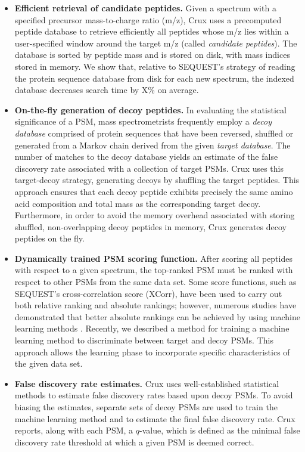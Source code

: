 \documentclass{bioinfo}
\begin{document}
\begin{itemize}

\item {\bf Efficient retrieval of candidate peptides.}  Given a
  spectrum with a specified precursor mass-to-charge ratio (m/z), Crux
  uses a precomputed peptide database to retrieve efficiently all
  peptides whose m/z lies within a user-specified window around the
  target m/z (called {\em candidate peptides}).  The database is
  sorted by peptide mass and is stored on disk, with mass indices
  stored in memory.  We show that, relative to SEQUEST's strategy of
  reading the protein sequence database from disk for each new
  spectrum, the indexed database decreases search time by X\% on
  average.

\item {\bf On-the-fly generation of decoy peptides.}  In evaluating
  the statistical significance of a PSM, mass spectrometrists
  frequently employ a {\em decoy database} comprised of protein
  sequences that have been reversed, shuffled or generated from a
  Markov chain derived from the given {\em target database}.  The
  number of matches to the decoy database yields an estimate of the
  false discovery rate associated with a collection of target PSMs.
  Crux uses this target-decoy strategy, generating decoys by shuffling
  the target peptides.  This approach ensures that each decoy peptide
  exhibits precisely the same amino acid composition and total mass as
  the corresponding target decoy.  Furthermore, in order to avoid the
  memory overhead associated with storing shuffled, non-overlapping
  decoy peptides in memory, Crux generates decoy peptides on the fly.

\item {\bf Dynamically trained PSM scoring function.}  After scoring
  all peptides with respect to a given spectrum, the top-ranked PSM
  must be ranked with respect to other PSMs from the same data set.
  Some score functions, such as SEQUEST's cross-correlation score
  (XCorr), have been used to carry out both relative ranking and
  absolute rankings; however, numerous studies have demonstrated that
  better absolute rankings can be achieved by using machine learning
  methods \cite{}.  Recently, we described a method for training a
  machine learning method to discriminate between target and decoy
  PSMs.  This approach allows the learning phase to incorporate
  specific characteristics of the given data set.

\item {\bf False discovery rate estimates.}  Crux uses
  well-established statistical methods to estimate false discovery
  rates based upon decoy PSMs.  To avoid biasing the estimates,
  separate sets of decoy PSMs are used to train the machine learning
  method and to estimate the final false discovery rate.  Crux
  reports, along with each PSM, a $q$-value, which is defined as the
  minimal false discovery rate threshold at which a given PSM is
  deemed correct.

\end{itemize}
\end{document}
